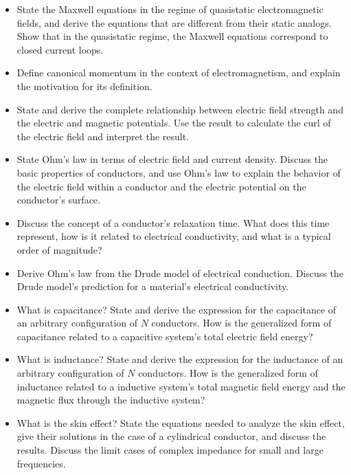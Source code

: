 \begin{itemize}

    \item State the Maxwell equations in the regime of quasistatic electromagnetic fields, and derive the equations that are different from their static analogs. Show that in the quasistatic regime, the Maxwell equations correspond to closed current loops.

    \item Define canonical momentum in the context of electromagnetism, and explain the motivation for its definition.

    \item State and derive the complete relationship between electric field strength and the electric and magnetic potentials. Use the result to calculate the curl of the electric field and interpret the result.

    \item State Ohm's law in terms of electric field and current density. Discuss the basic properties of conductors, and use Ohm's law to explain the behavior of the electric field within a conductor and the electric potential on the conductor's surface.

    \item Discuss the concept of a conductor's relaxation time. What does this time represent, how is it related to electrical conductivity, and what is a typical order of magnitude?

    \item Derive Ohm's law from the Drude model of electrical conduction. Discuss the Drude model's prediction for a material's electrical conductivity. 

    \item What is capacitance? State and derive the expression for the capacitance of an arbitrary configuration of $ N $ conductors. How is the generalized form of capacitance related to a capacitive system's total electric field energy?

    \item What is inductance? State and derive the expression for the inductance of an arbitrary configuration of $ N $ conductors. How is the generalized form of inductance related to a inductive system's total magnetic field energy and the magnetic flux through the inductive system?

    \item What is the skin effect? State the equations needed to analyze the skin effect, give their solutions in the case of a cylindrical conductor, and discuss the results. Discuss the limit cases of complex impedance for small and large frequencies.

\end{itemize}

